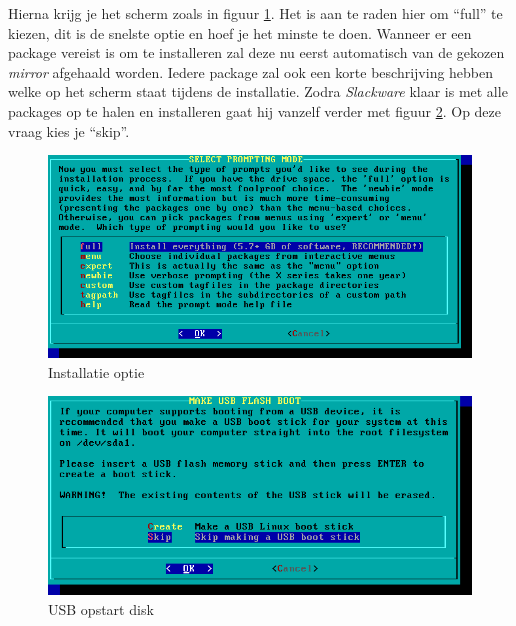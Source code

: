 Hierna krijg je het scherm zoals in figuur \ref{fig:install_full}. Het is aan te raden hier om ``full'' te kiezen, dit is de snelste optie en hoef je het minste te doen. Wanneer er een package vereist is om te installeren zal deze nu eerst automatisch van de gekozen \emph{mirror} afgehaald worden. Iedere package zal ook een korte beschrijving hebben welke op het scherm staat tijdens de installatie. Zodra \emph{Slackware} klaar is met alle packages op te halen en installeren gaat hij vanzelf verder met figuur \ref{fig:install_usb}. Op deze vraag kies je ``skip''.
\begin{figure}[H]
  \begin{center}
    \includegraphics[scale=0.5]{images/install_full}
  \end{center}
  \caption{Installatie optie}
  \label{fig:install_full}
\end{figure}

\begin{figure}[H]
  \begin{center}
    \includegraphics[scale=0.5]{images/install_usb}
  \end{center}
  \caption{USB opstart disk}
  \label{fig:install_usb}
\end{figure}


